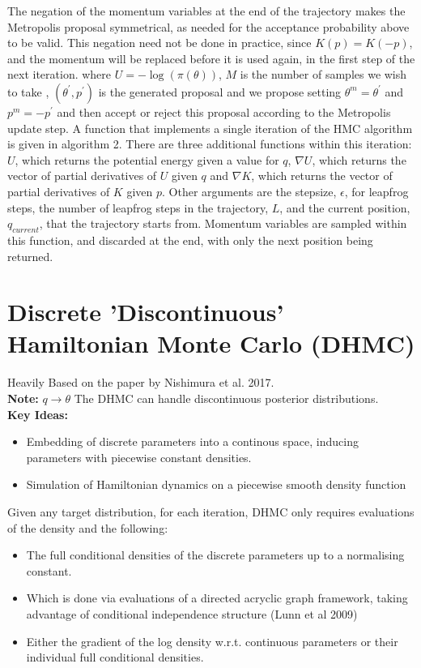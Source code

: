 \documentclass[]{report}
\begin{document}
The negation of the momentum variables at the end of the trajectory makes the Metropolis proposal symmetrical, as needed for the acceptance probability above to be valid. This negation need not be done in practice, since $K(p) = K(-p)$, and the momentum will be replaced before it is used again, in the first step of the next iteration.
where $U = -\log(\pi(\theta))$,  $M$ is the number of samples we wish to take , $(\theta^{'}, p^{'})$ is the generated proposal and we propose setting $\theta^{m} = \theta^{'}$ and $p^{m} = -p^{'}$ and then accept or reject this proposal according to the Metropolis update step. 
A function that implements a single iteration of the HMC algorithm is given in algorithm 2. There are three additional functions within this iteration: $U$, which returns the potential energy given a value for $q$,  $\nabla U$, which returns the vector of partial derivatives of $U$ given $q$ and $\nabla K$, which returns the vector of partial derivatives of $K$ given $p$. Other arguments are the stepsize, $\epsilon$, for leapfrog steps, the number of leapfrog steps in the trajectory, $L$, and the current position, $q_{current}$, that the trajectory starts from. Momentum variables are sampled within this function, and discarded at the end, with only the next position being returned. 

\section{Discrete 'Discontinuous' Hamiltonian Monte Carlo (DHMC)}

Heavily Based on the paper by Nishimura et al. 2017. \\
\textbf{Note: } $q \rightarrow \theta$
The DHMC can handle discontinuous posterior distributions. 
\\
\textbf{Key Ideas:}
\begin{itemize}
	\item Embedding of discrete parameters into a continous space, inducing parameters with piecewise constant densities. 
	\item Simulation of Hamiltonian dynamics on a piecewise smooth density function
\end{itemize} 
Given any target distribution, for each iteration, DHMC only requires evaluations of the density and the following:
\begin{itemize}
	\item The full conditional densities of the discrete parameters up to a normalising constant. 
	\item Which is done via evaluations of a directed acryclic graph framework, taking advantage of conditional independence structure (Lunn et al 2009)
	\item Either the gradient of the log density w.r.t. continuous parameters or their individual full conditional densities. 
\end{itemize}
\end{document}
